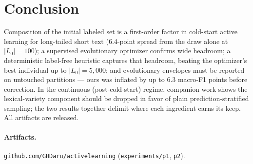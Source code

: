 \documentclass[11pt]{article}
\begin{document}
\section{Conclusion}
\label{sec:conclusion}

Composition of the initial labeled set is a first-order factor in
cold-start active learning for long-tailed short text (6.4-point spread
from the draw alone at $|L_0|=100$); a supervised evolutionary optimizer
confirms wide headroom; a deterministic label-free heuristic captures
that headroom, beating the optimizer's best individual up to
$|L_0|=5{,}000$; and evolutionary envelopes must be reported on untouched
partitions --- ours was inflated by up to 6.3 macro-F1 points before
correction. In the continuous (post-cold-start) regime, companion work
shows the lexical-variety component should be dropped in favor of plain
prediction-stratified sampling; the two results together delimit where
each ingredient earns its keep. All artifacts are released.

\paragraph{Artifacts.} \texttt{github.com/GHDaru/activelearning}
(\texttt{experiments/p1}, \texttt{p2}).



\end{document}
